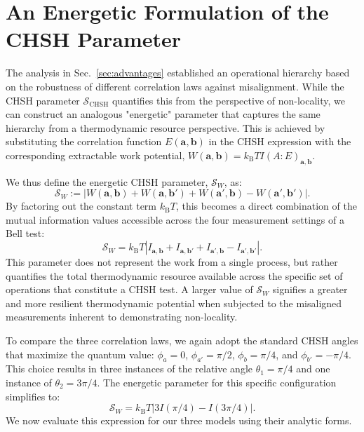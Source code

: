 \documentclass[%
  reprint,
  showpacs,
  showkeys,
  pra,
  longbibliography,
  floatfix,
  x11names
]{revtex4-2}
\begin{document}
\section{An Energetic Formulation of the CHSH Parameter}
\label{sec:energetic_chsh}

The analysis in Sec.~\ref{sec:advantages} established an operational hierarchy based on the robustness of different correlation laws against misalignment. While the CHSH parameter $\mathcal{S}_{\mathrm{CHSH}}$ quantifies this from the perspective of non-locality, we can construct an analogous "energetic" parameter that captures the same hierarchy from a thermodynamic resource perspective. This is achieved by substituting the correlation function $E(\mathbf{a},\mathbf{b})$ in the CHSH expression with the corresponding extractable work potential, $W(\mathbf{a},\mathbf{b}) = k_{\mathrm{B}}T I(A:E)_{\mathbf{a},\mathbf{b}}$.

We thus define the energetic CHSH parameter, $\mathcal{S}_W$, as:
\begin{equation}
\mathcal{S}_W := |W(\mathbf{a},\mathbf{b}) + W(\mathbf{a},\mathbf{b}') + W(\mathbf{a}',\mathbf{b}) - W(\mathbf{a}',\mathbf{b}')|.
\end{equation}
By factoring out the constant term $k_{\mathrm{B}}T$, this becomes a direct combination of the mutual information values accessible across the four measurement settings of a Bell test:
\begin{equation}
\mathcal{S}_W = k_{\mathrm{B}}T |I_{\mathbf{a},\mathbf{b}} + I_{\mathbf{a},\mathbf{b}'} + I_{\mathbf{a}',\mathbf{b}} - I_{\mathbf{a}',\mathbf{b}'}|.
\end{equation}
This parameter does not represent the work from a single process, but rather quantifies the total thermodynamic resource available across the specific set of operations that constitute a CHSH test. A larger value of $\mathcal{S}_W$ signifies a greater and more resilient thermodynamic potential when subjected to the misaligned measurements inherent to demonstrating non-locality.

To compare the three correlation laws, we again adopt the standard CHSH angles that maximize the quantum value: $\phi_a=0$, $\phi_{a'}=\pi/2$, $\phi_b=\pi/4$, and $\phi_{b'}=-\pi/4$. This choice results in three instances of the relative angle $\theta_1 = \pi/4$ and one instance of $\theta_2 = 3\pi/4$. The energetic parameter for this specific configuration simplifies to:
\begin{equation}
\mathcal{S}_W = k_{\mathrm{B}}T |3I(\pi/4) - I(3\pi/4)|.
\end{equation}
We now evaluate this expression for our three models using their analytic forms.
\end{document}
